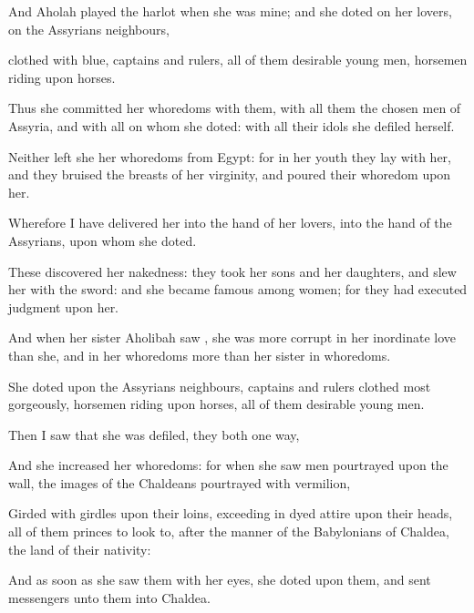 {And
Aholah played the
harlot when she was
mine; and she
doted on her
lovers, on the
Assyrians
{}
neighbours,

clothed with
blue,
captains and
rulers, all of them
desirable young
men,
horsemen
riding upon
horses.

Thus she
committed her
whoredoms with them, with all them
{} the
chosen
men of
Assyria, and with all on whom she
doted: with all their
idols she
defiled herself.

Neither
left she her
whoredoms
{} from
Egypt: for in her
youth they
lay with her, and they
bruised the
breasts of her
virginity, and
poured their
whoredom upon her.

Wherefore I have
delivered her into the
hand of her
lovers, into the
hand of the
Assyrians, upon whom she
doted.

These
discovered her
nakedness: they
took her
sons and her
daughters, and
slew her with the
sword: and she became
famous among
women; for they had
executed
judgment upon her.


\par }{\PP {}And when her
sister
Aholibah
saw
{}, she was more
corrupt in her inordinate
love than she, and in her
whoredoms more than her
sister in
{}
whoredoms.

She
doted upon the
Assyrians
{}
neighbours,
captains and
rulers
clothed most
gorgeously,
horsemen
riding upon
horses, all of them
desirable young
men.

Then I
saw that she was
defiled,
{} they
{}
both
one
way,

And
{} she
increased her
whoredoms: for when she
saw
men
pourtrayed upon the
wall, the
images of the
Chaldeans
pourtrayed with
vermilion,

Girded with
girdles upon their
loins,
exceeding in dyed
attire upon their
heads, all of them
princes to look
to, after the
manner of the
Babylonians of
Chaldea, the
land of their
nativity:

And as soon as she
saw them with her
eyes, she
doted upon them, and
sent
messengers unto them into
Chaldea.

}
